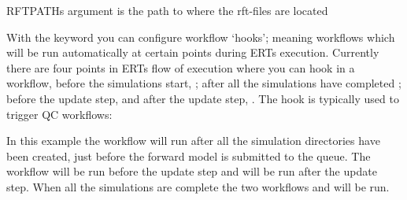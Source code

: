 \documentclass[a4paper,10pt,english]{sphinxmanual}
\begin{document}
\begin{sphinxShadowBox}

RFTPATHs argument is the path to where the rft-files are located

%
\begin{sphinxVerbatim}[commandchars=\\\{\}]
  
\end{sphinxVerbatim}
\end{sphinxShadowBox}
\label{\detokenize{keywords/index:hook-workflow}}
With the keyword  you can configure workflow ‘hooks’;
meaning workflows which will be run automatically at certain points during ERTs
execution. Currently there are four points in ERTs flow of execution where you
can hook in a workflow, before the simulations start, ;
after all the simulations have completed ; before the
update step,  and after the update step, .
The  hook is typically used to trigger QC workflows:

%
\begin{sphinxVerbatim}[commandchars=\\\{\}]
         
    
   
         
         
\end{sphinxVerbatim}

In this example the workflow  will run after all the simulation
directories have been created, just before the forward model is submitted to the
queue. The workflow  will be run before the update step
and  will be run after the update step. When all the
simulations are complete the two workflows  and
 will be run.
\end{document}

